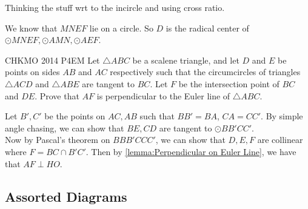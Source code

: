 




\begin{prooof}
    Thinking the stuff wrt to the incircle and using cross ratio.
\end{prooof}


\begin{minipage}{.5\linewidth}
    \begin{prooof}
        We know that $MNEF$ lie on a circle. So $D$ is the radical center of
        $\odot MNEF, \odot AMN, \odot AEF$.
    \end{prooof}
\end{minipage}\hfill%
\begin{minipage}{.45\linewidth}
\end{minipage}



\begin{minipage}{.54\linewidth}
    {CHKMO 2014 P4}{EM}{
        Let $\triangle ABC$ be a scalene triangle, and let $D$ and $E$ be points
        on sides $AB$ and $AC$ respectively such that the circumcircles of
        triangles $\triangle ACD$ and $\triangle ABE$ are tangent to $BC$. Let $F$
        be the intersection point of $BC$ and $DE$. Prove that $AF$ is
        perpendicular to the Euler line of $\triangle ABC$.
    }
    \begin{solution}
        Let $B', C'$ be the points on $AC, AB$ such that $BB' = BA$, $CA = CC'$.
        By simple angle chasing, we can show that $BE, CD$ are tangent to $\odot
        BB'CC'$.\\

        Now by Pascal's theorem on $BBB'CCC'$, we can show that $D, E, F$ are
        collinear where $F = BC\cap B'C'$. Then by \autoref{lemma:Perpendicular on
        Euler Line}, we have that $AF\perp HO$.
    \end{solution}

\end{minipage}\hfill%
\begin{minipage}{.45\linewidth}
\end{minipage}



\newpage
\subsection{Assorted Diagrams}


